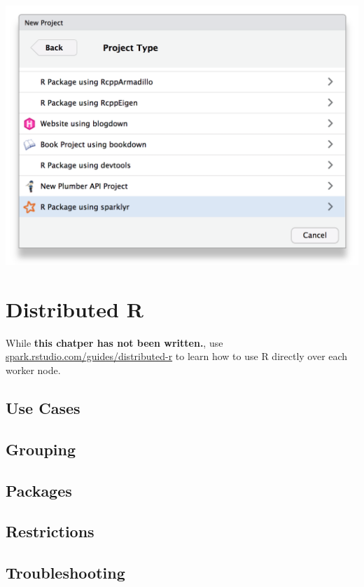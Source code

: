 \documentclass[]{book}
\theoremstyle{definition}
\theoremstyle{definition}
\theoremstyle{definition}
\theoremstyle{remark}
\begin{document}
\includegraphics{images/08-extensions-rstudio-project.png}

\hypertarget{distributed}{%
\chapter{Distributed R}\label{distributed}}

While \textbf{this chatper has not been written.}, use
\href{http://spark.rstudio.com/guides/distributed-r/}{spark.rstudio.com/guides/distributed-r}
to learn how to use R directly over each worker node.

\hypertarget{use-cases}{%
\section{Use Cases}\label{use-cases}}

\hypertarget{grouping}{%
\section{Grouping}\label{grouping}}

\hypertarget{packages}{%
\section{Packages}\label{packages}}

\hypertarget{restrictions}{%
\section{Restrictions}\label{restrictions}}

\hypertarget{troubleshooting-2}{%
\section{Troubleshooting}\label{troubleshooting-2}}
\end{document}
